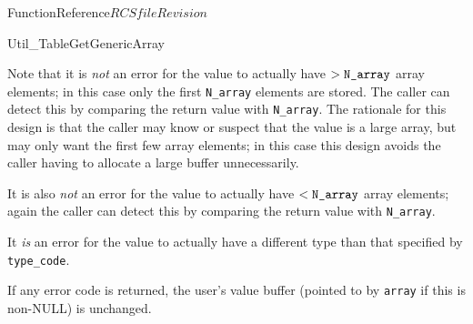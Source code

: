 \begin{cactuspart}{FunctionReference}{$RCSfile$}{$Revision$}
\begin{FunctionDescription}{Util\_TableGetGenericArray}
\begin{Discussion}
Note that it is {\em not\/} an error for the value to actually have
$> \verb|N_array|$ array elements; in this case only the first \verb|N_array|
elements are stored.  The caller can detect this by comparing the
return value with \verb|N_array|.
The rationale for this design is that the caller may know or suspect
that the value is a large array, but may only want the first few array
elements; in this case this design avoids the caller having to allocate
a large buffer unnecessarily.

It is also {\em not\/} an error for the value to actually have
$< \verb|N_array|$ array elements; again the caller can detect this by
comparing the return value with \verb|N_array|.

It {\em is\/} an error for the value to actually have a different type
than that specified by \verb|type_code|.

If any error code is returned, the user's value buffer
(pointed to by \verb|array| if this is non-NULL) is unchanged.
\end{Discussion}


\end{FunctionDescription}
\end{cactuspart}
